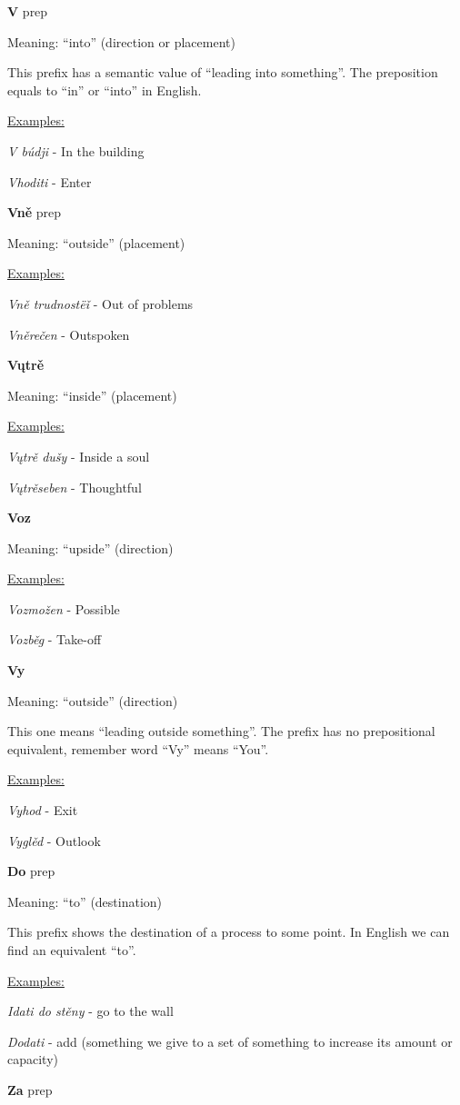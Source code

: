 \textbf{V} \gls{prep}

Meaning: “into” (direction or placement)

This prefix has a semantic value of “leading into something”. The preposition equals to “in” or “into” in English.

\underline{Examples:}

\textit{V búdji }- In the building

\textit{Vhoditi} - Enter

\textbf{Vně} \gls{prep}

Meaning: “outside” (placement)

\underline{Examples:}

\textit{Vně trudnostëǐ} - Out of problems

\textit{Vněrečen} - Outspoken

\textbf{Vųtrě}

Meaning: “inside” (placement)

\underline{Examples:}

\textit{Vųtrě dušy} - Inside a soul

\textit{Vųtrěseben} - Thoughtful

\textbf{Voz}

Meaning: “upside” (direction)

\underline{Examples:}

\textit{Vozmožen} - Possible

\textit{Vozběg} - Take-off

\textbf{Vy}

Meaning: “outside” (direction)

This one means “leading outside something”. The prefix has no prepositional equivalent, remember word “Vy” means “You”.

\underline{Examples:}

\textit{Vyhod} - Exit

\textit{Vyglěd} - Outlook

\textbf{Do} \gls{prep}

Meaning: “to” (destination)

This prefix shows the destination of a process to some point. In English we can find an equivalent “to”.

\underline{Examples:}

\textit{Idati do stěny }- go to the wall

\textit{Dodati} - add (something we give to a set of something to increase its amount or capacity)

\textbf{Za} \gls{prep}


